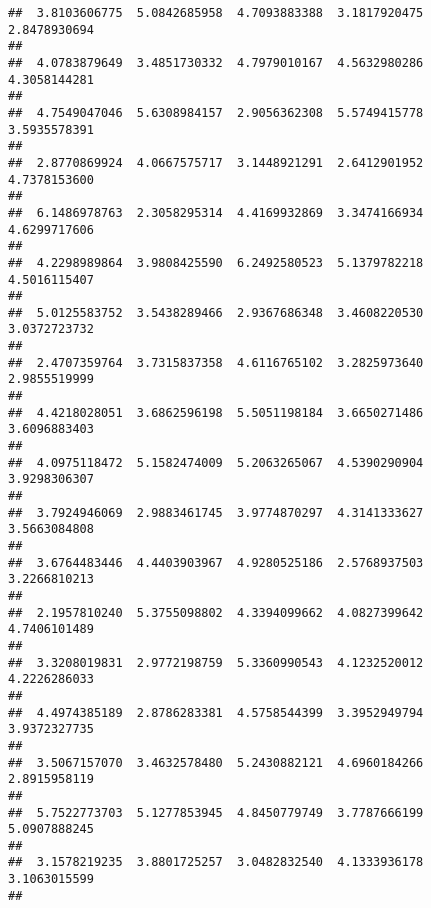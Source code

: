 \documentclass[]{article}
\begin{document}
\begin{verbatim}
##  3.8103606775  5.0842685958  4.7093883388  3.1817920475  2.8478930694 
##                                                                       
##  4.0783879649  3.4851730332  4.7979010167  4.5632980286  4.3058144281 
##                                                                       
##  4.7549047046  5.6308984157  2.9056362308  5.5749415778  3.5935578391 
##                                                                       
##  2.8770869924  4.0667575717  3.1448921291  2.6412901952  4.7378153600 
##                                                                       
##  6.1486978763  2.3058295314  4.4169932869  3.3474166934  4.6299717606 
##                                                                       
##  4.2298989864  3.9808425590  6.2492580523  5.1379782218  4.5016115407 
##                                                                       
##  5.0125583752  3.5438289466  2.9367686348  3.4608220530  3.0372723732 
##                                                                       
##  2.4707359764  3.7315837358  4.6116765102  3.2825973640  2.9855519999 
##                                                                       
##  4.4218028051  3.6862596198  5.5051198184  3.6650271486  3.6096883403 
##                                                                       
##  4.0975118472  5.1582474009  5.2063265067  4.5390290904  3.9298306307 
##                                                                       
##  3.7924946069  2.9883461745  3.9774870297  4.3141333627  3.5663084808 
##                                                                       
##  3.6764483446  4.4403903967  4.9280525186  2.5768937503  3.2266810213 
##                                                                       
##  2.1957810240  5.3755098802  4.3394099662  4.0827399642  4.7406101489 
##                                                                       
##  3.3208019831  2.9772198759  5.3360990543  4.1232520012  4.2226286033 
##                                                                       
##  4.4974385189  2.8786283381  4.5758544399  3.3952949794  3.9372327735 
##                                                                       
##  3.5067157070  3.4632578480  5.2430882121  4.6960184266  2.8915958119 
##                                                                       
##  5.7522773703  5.1277853945  4.8450779749  3.7787666199  5.0907888245 
##                                                                       
##  3.1578219235  3.8801725257  3.0482832540  4.1333936178  3.1063015599 
##                                                                       

\end{verbatim}
\end{document}
